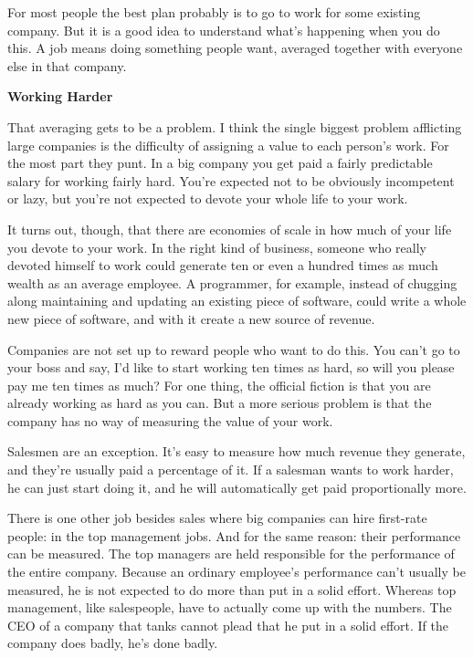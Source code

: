 For most people the best plan probably is to go
                    to work for some existing company. But it is a good idea to
                    understand what's happening when you do this. A job means
                    doing something people want, averaged together with everyone
                    else in that company.

\textbf{Working Harder}

That averaging gets to be a problem. I think
                    the single biggest problem afflicting large companies is the
                    difficulty of assigning a value to each person's work. For
                    the most part they punt. In a big company you get paid a
                    fairly predictable salary for working fairly hard. You're
                    expected not to be obviously incompetent or lazy, but you're
                    not expected to devote your whole life to your work.

It
                    turns out, though, that there are economies of scale in how
                    much of your life you devote to your work. In the right kind
                    of business, someone who really devoted himself to work
                    could generate ten or even a hundred times as much wealth as
                    an average employee. A programmer, for example, instead of
                    chugging along maintaining and updating an existing piece of
                    software, could write a whole new piece of software, and
                    with it create a new source of revenue.

Companies
                    are not set up to reward people who want to do this. You
                    can't go to your boss and say, I'd like to start working ten
                    times as hard, so will you please pay me ten times as much?
                    For one thing, the official fiction is that you are already
                    working as hard as you can. But a more serious problem is
                    that the company has no way of measuring the value of your
                    work.

Salesmen are an exception. It's easy to
                    measure how much revenue they generate, and they're usually
                    paid a percentage of it. If a salesman wants to work harder,
                    he can just start doing it, and he will automatically get
                    paid proportionally more.

There is one other job
                    besides sales where big companies can hire first-rate
                    people: in the top management jobs. And for the same reason:
                    their performance can be measured. The top managers are held
                    responsible for the performance of the entire company.
                    Because an ordinary employee's performance can't usually be
                    measured, he is not expected to do more than put in a solid
                    effort. Whereas top management, like salespeople, have to
                    actually come up with the numbers. The CEO of a company that
                    tanks cannot plead that he put in a solid effort. If the
                    company does badly, he's done badly.

